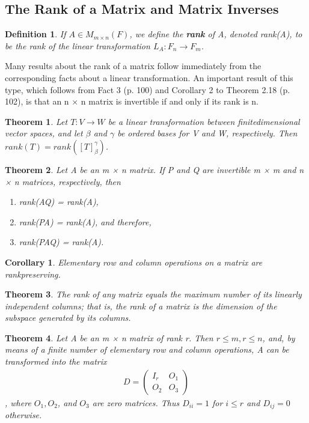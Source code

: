 \documentclass{article}
\newcommand{\bd}[1]{\textbf{#1}}
\newcommand*\bpmat[0]{\begin{pmatrix}}
\newcommand*\epmat[0]{\end{pmatrix}}
\theoremstyle{plain}
\newtheorem{theorem}{Theorem}[section]
\newtheorem*{corollary}{Corollary}
\newtheorem*{definition1}{Definition}
\theoremstyle{plain} %
\begin{document}
\subsection{The Rank of a Matrix and Matrix Inverses}

\begin{definition1}
  If $A \in M_{m\times n}(F)$, we define the \bd{rank} of A, denoted rank(A), to be the rank of the linear transformation $L_A : F_n \to F_m$.
\end{definition1}

Many results about the rank of a matrix follow immediately from the corresponding facts about a linear transformation. An important result of this type, which follows from Fact 3 (p. 100) and Corollary 2 to Theorem 2.18 (p. 102), is that an n × n matrix is invertible if and only if its rank is n.

\begin{theorem}
  Let $T: V \to W$ be a linear transformation between finitedimensional vector spaces, and let $\beta$ and $\gamma$ be ordered bases for V and W, respectively. Then $rank(T) = rank([T]_{\beta}^\gamma)$.
\end{theorem}

\begin{theorem}
  Let A be an m × n matrix. If P and Q are invertible
m × m and n × n matrices, respectively, then
\begin{enumerate}[label=(\alph*)]
  \item rank(AQ) = rank(A),
  \item rank(PA) = rank(A),
and therefore,
  \item rank(PAQ) = rank(A).
\end{enumerate}
\end{theorem}

\begin{corollary}
  Elementary row and column operations on a matrix are rankpreserving.
\end{corollary}

\begin{theorem}
  The rank of any matrix equals the maximum number of its linearly independent columns; that is, the rank of a matrix is the dimension of the subspace generated by its columns.
\end{theorem}

\begin{theorem}
  Let A be an m × n matrix of rank r. Then $r \leq m, r \leq n$, and, by means of a finite number of elementary row and column operations, A can be transformed into the matrix
  \begin{align*}
    D=\bpmat I_r&O_1\\O_2&O_3\epmat
  \end{align*}
, where $O_1, O_2$, and $O_3$ are zero matrices. Thus $D_{ii} = 1$ for $i \leq r$ and $D_{ij} = 0$ otherwise.
\end{theorem}
\end{document}
